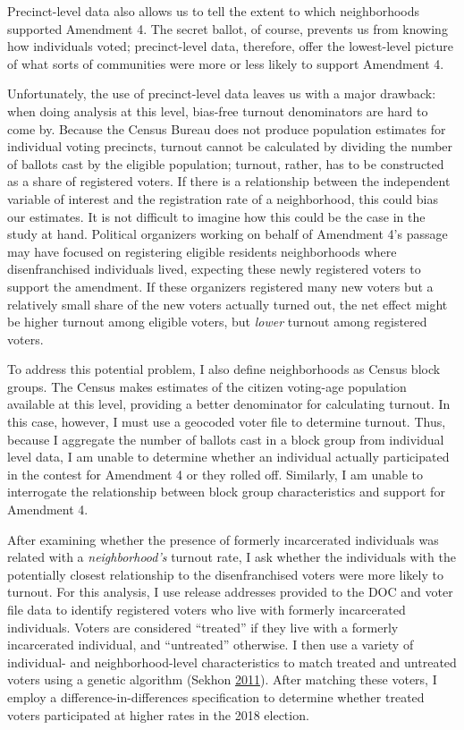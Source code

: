 \documentclass[
  12pt,
]{article}
\begin{document}
Precinct-level data also allows us to tell the extent to which neighborhoods supported Amendment 4. The secret ballot, of course, prevents us from knowing how individuals voted; precinct-level data, therefore, offer the lowest-level picture of what sorts of communities were more or less likely to support Amendment 4.

Unfortunately, the use of precinct-level data leaves us with a major drawback: when doing analysis at this level, bias-free turnout denominators are hard to come by. Because the Census Bureau does not produce population estimates for individual voting precincts, turnout cannot be calculated by dividing the number of ballots cast by the eligible population; turnout, rather, has to be constructed as a share of registered voters. If there is a relationship between the independent variable of interest and the registration rate of a neighborhood, this could bias our estimates. It is not difficult to imagine how this could be the case in the study at hand. Political organizers working on behalf of Amendment 4's passage may have focused on registering eligible residents neighborhoods where disenfranchised individuals lived, expecting these newly registered voters to support the amendment. If these organizers registered many new voters but a relatively small share of the new voters actually turned out, the net effect might be higher turnout among eligible voters, but \emph{lower} turnout among registered voters.

To address this potential problem, I also define neighborhoods as Census block groups. The Census makes estimates of the citizen voting-age population available at this level, providing a better denominator for calculating turnout. In this case, however, I must use a geocoded voter file to determine turnout. Thus, because I aggregate the number of ballots cast in a block group from individual level data, I am unable to determine whether an individual actually participated in the contest for Amendment 4 or they rolled off. Similarly, I am unable to interrogate the relationship between block group characteristics and support for Amendment 4.

After examining whether the presence of formerly incarcerated individuals was related with a \emph{neighborhood's} turnout rate, I ask whether the individuals with the potentially closest relationship to the disenfranchised voters were more likely to turnout. For this analysis, I use release addresses provided to the DOC and voter file data to identify registered voters who live with formerly incarcerated individuals. Voters are considered ``treated'' if they live with a formerly incarcerated individual, and ``untreated'' otherwise. I then use a variety of individual- and neighborhood-level characteristics to match treated and untreated voters using a genetic algorithm (Sekhon \protect\hyperlink{ref-Sekhon2011}{2011}). After matching these voters, I employ a difference-in-differences specification to determine whether treated voters participated at higher rates in the 2018 election.
\end{document}
